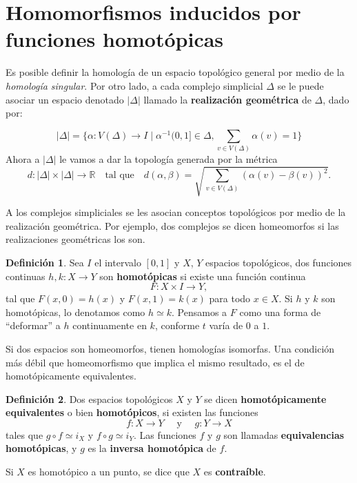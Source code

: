 \documentclass[12pt]{book}
\newtheorem{theorem}{Teorema}[section]
\theoremstyle{definition}
\newtheorem{definition}[theorem]{Definición}
\newcounter{in}
\newcounter{ini}
\begin{document}
\section[Homomorfismos inducidos]{Homomorfismos inducidos por funciones homotópicas}
\label{hom-ind}

Es posible definir la homología de un espacio topológico general por
medio de la \emph{homología singular}. Por otro lado, a cada complejo
simplicial $\Delta$ se le puede asociar un espacio denotado $|\Delta|$
llamado la \textbf{realización geométrica} de $\Delta$, dado por:

$$|\Delta|=\{\alpha:V(\Delta)\rightarrow I\mid\alpha^{-1}(0,1]\in
\Delta, \sum _{v\in V(\Delta)}\alpha(v)=1\}$$
Ahora a $|\Delta|$ le vamos a dar la topología generada por la métrica
\begin{equation*}
  \label{metrica}
  d:|\Delta|\times |\Delta|\rightarrow  \mathbb{R} \quad \mbox{tal
    que}\quad d(\alpha,\beta)=\sqrt{\sum _{v\in V(\Delta)}(\alpha(v)-\beta(v))^{2}}.
\end{equation*}

A los complejos simpliciales se les asocian conceptos topológicos por
medio de la realización geométrica. Por ejemplo, dos complejos se
dicen homeomorfos si las realizaciones geométricas los son.

\begin{definition}
  Sea $I$ el intervalo $[0,1]$ y $X$, $Y$ espacios topológicos, dos funciones continuas
  $h,k:X\rightarrow Y$ son \textbf{homotópicas} si existe una función continua
  $$F:X\times I\rightarrow Y,$$
  tal que $F(x,0)=h(x)$ y $F(x,1)=k(x)$ para todo $x\in X.$ Si $h$ y
  $k$ son homotópicas, lo denotamos como $h\simeq k$. Pensamos a $F$
  como una forma de ``deformar'' a $h$ continuamente en $k$, conforme
  $t$ varía de $0$ a $1$.
\end{definition}


Si dos espacios son homeomorfos, tienen homologías isomorfas. Una
condición más débil que homeomorfismo que implica el mismo resultado,
es el de homotópicamente equivalentes.
 
\begin{definition}
  Dos espacios topológicos $X$ y $Y$ se dicen \textbf{homotópicamente
    equivalentes} o bien \textbf{homotópicos}, si existen las funciones
  $$f:X\rightarrow Y \quad \mbox{ y }\quad g:Y\rightarrow X$$
  tales que $g\circ f\simeq i_{X}$ y $f\circ g\simeq i_{Y}$. Las
  funciones $f$ y $g$ son llamadas\textbf{ equivalencias homotópicas},
  y $g$ es la \textbf{inversa homotópica} de $f$. 
\end{definition}
Si $X$ es homotópico a un punto, se dice que $X$ es
\textbf{contraíble}.
\end{document}
